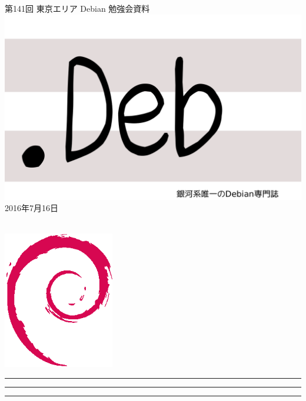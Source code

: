 \documentclass[mingoth,a4paper]{jsarticle}
\newcommand{\debmtgyear}{2016}
\newcommand{\debmtgmonth}{7}
\newcommand{\debmtgdate}{16}
\newcommand{\debmtgnumber}{141}
\begin{document}
\begin{titlepage}
\thispagestyle{empty}

\vspace*{-2cm}
第\debmtgnumber{}回 東京エリア Debian 勉強会資料\\
\hspace*{-2cm}
\includegraphics{image2012-natsu/dotdeb.pdf}\\
\hfill{}\debmtgyear{}年\debmtgmonth{}月\debmtgdate{}日

\\

\vspace*{-2cm}
\hfill{}\includegraphics[height=6cm]{image200502/openlogo-nd.eps}
\end{titlepage}

\newpage

\begin{minipage}[b]{0.2\hsize}
 \colorbox{titleback}{}
\end{minipage}
\begin{minipage}[b]{0.8\hsize}
\hrule
\vspace{2mm}
\hrule
\begin{multicols}{2}
\tableofcontents
\end{multicols}
\vspace{2mm}
\hrule
\end{minipage}
\end{document}

